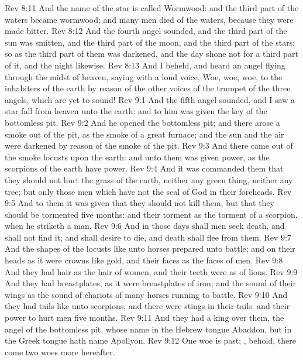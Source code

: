 \vs Rev 8:11 And the name of the star is called Wormwood: and the third part of the waters became wormwood; and many men died of the waters, because they were made bitter.
\vs Rev 8:12 And the fourth angel sounded, and the third part of the sun was smitten, and the third part of the moon, and the third part of the stars; so as the third part of them was darkened, and the day shone not for a third part of it, and the night likewise.
\vs Rev 8:13 And I beheld, and heard an angel flying through the midst of heaven, saying with a loud voice, Woe, woe, woe, to the inhabiters of the earth by reason of the other voices of the trumpet of the three angels, which are yet to sound!
\vs Rev 9:1 And the fifth angel sounded, and I saw a star fall from heaven unto the earth: and to him was given the key of the bottomless pit.
\vs Rev 9:2 And he opened the bottomless pit; and there arose a smoke out of the pit, as the smoke of a great furnace; and the sun and the air were darkened by reason of the smoke of the pit.
\vs Rev 9:3 And there came out of the smoke locusts upon the earth: and unto them was given power, as the scorpions of the earth have power.
\vs Rev 9:4 And it was commanded them that they should not hurt the grass of the earth, neither any green thing, neither any tree; but only those men which have not the seal of God in their foreheads.
\vs Rev 9:5 And to them it was given that they should not kill them, but that they should be tormented five months: and their torment  as the torment of a scorpion, when he striketh a man.
\vs Rev 9:6 And in those days shall men seek death, and shall not find it; and shall desire to die, and death shall flee from them.
\vs Rev 9:7 And the shapes of the locusts  like unto horses prepared unto battle; and on their heads  as it were crowns like gold, and their faces  as the faces of men.
\vs Rev 9:8 And they had hair as the hair of women, and their teeth were as  of lions.
\vs Rev 9:9 And they had breastplates, as it were breastplates of iron; and the sound of their wings  as the sound of chariots of many horses running to battle.
\vs Rev 9:10 And they had tails like unto scorpions, and there were stings in their tails: and their power  to hurt men five months.
\vs Rev 9:11 And they had a king over them,  the angel of the bottomless pit, whose name in the Hebrew tongue  Abaddon, but in the Greek tongue hath  name Apollyon.
\vs Rev 9:12 One woe is past; , behold, there come two woes more hereafter.
